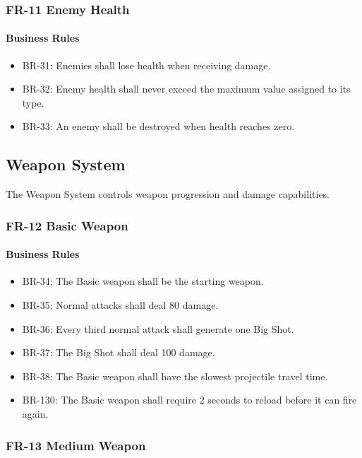 \documentclass[11pt,a4paper]{article}
\begin{document}
\subsubsection{FR-11 Enemy Health}

\paragraph{Business Rules}
\begin{itemize}
  \item BR-31: Enemies shall lose health when receiving damage.
  \item BR-32: Enemy health shall never exceed the maximum value assigned to its
        type.
  \item BR-33: An enemy shall be destroyed when health reaches zero.
\end{itemize}

\subsection{Weapon System}

The Weapon System controls weapon progression and damage capabilities.

\subsubsection{FR-12 Basic Weapon}

\paragraph{Business Rules}
\begin{itemize}
  \item BR-34: The Basic weapon shall be the starting weapon.
  \item BR-35: Normal attacks shall deal 80 damage.
  \item BR-36: Every third normal attack shall generate one Big Shot.
  \item BR-37: The Big Shot shall deal 100 damage.
  \item BR-38: The Basic weapon shall have the slowest projectile travel time.
  \item BR-130: The Basic weapon shall require 2 seconds to reload before it can
        fire again.
\end{itemize}

\subsubsection{FR-13 Medium Weapon}
\end{document}
